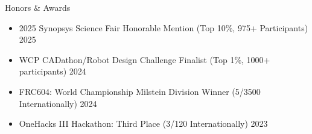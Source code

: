 \documentclass[
  10pt, %
]{resume}
\begin{document}
\begin{rSection}{Honors \& Awards}

  \begin{itemize}
      \setlength\itemsep{-0.7em} %
        
      \item 2025 Synopsys Science Fair Honorable Mention (Top 10\%, 975+ Participants) \hfill 2025
              
      \item WCP CADathon/Robot Design Challenge Finalist (Top 1\%, 1000+ participants) \hfill 2024
              
      \item FRC604: World Championship Milstein Division Winner (5/3500 Internationally) \hfill 2024
              
      \item OneHacks III Hackathon: Third Place (3/120 Internationally) \hfill 2023
              


    \end{itemize}

\end{rSection}
\end{document}
